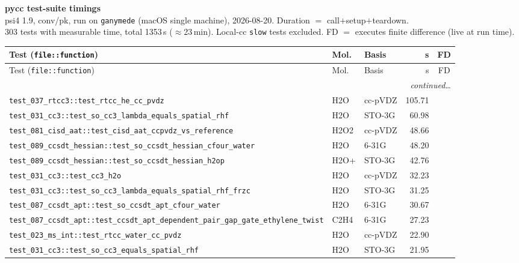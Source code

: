\documentclass[10pt]{article}
\begin{document}
\begin{center}{\Large\bfseries pycc test-suite timings}\\[3pt]
psi4 1.9, conv/pk, run on \texttt{ganymede} (macOS single machine), 2026-08-20. Duration $=$ call$+$setup$+$teardown.\\[2pt]
303 tests with measurable time, total 1353\,s ($\approx$23\,min). Local-cc \texttt{slow} tests excluded. FD $=$ executes finite difference (live at run time).
\end{center}
\scriptsize
\begin{longtable}{l l l r c}
\toprule Test (\texttt{file::function}) & Mol. & Basis & s & FD \\ \midrule \endfirsthead
\toprule Test (\texttt{file::function}) & Mol. & Basis & s & FD \\ \midrule \endhead
\midrule \multicolumn{5}{r}{\emph{continued\ldots}} \\ \endfoot \bottomrule \endlastfoot
\texttt{test\_037\_rtcc3::test\_rtcc\_he\_cc\_pvdz} & H2O & cc-pVDZ & 105.71 &  \\
\texttt{test\_031\_cc3::test\_so\_cc3\_lambda\_equals\_spatial\_rhf} & H2O & STO-3G & 60.98 &  \\
\texttt{test\_081\_cisd\_aat::test\_cisd\_aat\_ccpvdz\_vs\_reference} & H2O2 & cc-pVDZ & 48.66 &  \\
\texttt{test\_089\_ccsdt\_hessian::test\_so\_ccsdt\_hessian\_cfour\_water} & H2O & 6-31G & 48.20 &  \\
\texttt{test\_089\_ccsdt\_hessian::test\_so\_ccsdt\_hessian\_h2op} & H2O+ & STO-3G & 42.76 &  \\
\texttt{test\_031\_cc3::test\_cc3\_h2o} & H2O & cc-pVDZ & 32.23 &  \\
\texttt{test\_031\_cc3::test\_so\_cc3\_lambda\_equals\_spatial\_rhf\_frzc} & H2O & STO-3G & 31.25 &  \\
\texttt{test\_087\_ccsdt\_apt::test\_so\_ccsdt\_apt\_cfour\_water} & H2O & 6-31G & 30.67 &  \\
\texttt{test\_087\_ccsdt\_apt::test\_ccsdt\_apt\_dependent\_pair\_gap\_gate\_ethylene\_twist} & C2H4 & 6-31G & 27.23 &  \\
\texttt{test\_023\_ms\_int::test\_rtcc\_water\_cc\_pvdz} & H2O & cc-pVDZ & 22.90 &  \\
\texttt{test\_031\_cc3::test\_so\_cc3\_equals\_spatial\_rhf} & H2O & STO-3G & 21.95 &  \\

\end{longtable}
\end{document}
